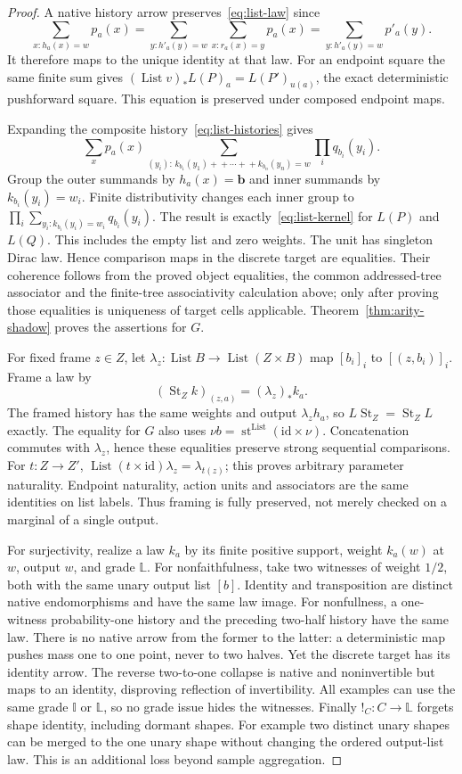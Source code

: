 \documentclass[11pt,a4paper]{article}
\theoremstyle{definition}
\newcommand{\id}{\mathrm{id}}
\newcommand{\st}{\operatorname{St}}
\newcommand{\List}{\operatorname{List}}
\begin{document}
\begin{proof}
A native history arrow preserves~\eqref{eq:list-law} since
\[
 \sum_{x:h_a(x)=w}p_a(x)
 =\sum_{y:h'_a(y)=w}\sum_{x:r_a(x)=y}p_a(x)
 =\sum_{y:h'_a(y)=w}p'_a(y).
\]
It therefore maps to the unique identity at that law. For an endpoint
square the same finite sum gives
$(\List v)_*L(P)_a=L(P')_{u(a)}$, the exact deterministic pushforward square.
This equation is preserved under composed endpoint maps.

Expanding the composite history~\eqref{eq:list-histories} gives
\[
 \sum_{x}p_a(x)
 \sum_{(y_i):\, k_{b_1}(y_1)+\!+\cdots+\!+k_{b_n}(y_n)=w}
                  \prod_iq_{b_i}(y_i).
\]
Group the outer summands by $h_a(x)=\mathbf b$ and inner summands by
$k_{b_i}(y_i)=w_i$. Finite distributivity changes each inner group to
$\prod_i\sum_{y_i:k_{b_i}(y_i)=w_i}q_{b_i}(y_i)$.
The result is exactly~\eqref{eq:list-kernel} for $L(P)$ and $L(Q)$.
This includes the empty list and zero weights. The unit has singleton
Dirac law. Hence comparison maps in the discrete target are equalities.
Their coherence follows from the proved object equalities, the common
addressed-tree associator and the finite-tree associativity calculation
above; only after proving those equalities is uniqueness of target cells
applicable. Theorem~\ref{thm:arity-shadow} proves the assertions for $G$.

For fixed frame $z\in Z$, let $\lambda_z:\List B\to\List(Z\times B)$
map $[b_i]_i$ to $[(z,b_i)]_i$. Frame a law by
\[
 (\st_Zk)_{(z,a)}=(\lambda_z)_*k_a.
\]
The framed history has the same weights and output $\lambda_zh_a$, so
$L\st_Z=\st_ZL$ exactly. The equality for $G$ also uses
$\nu b=\operatorname{st}^{\List}(\id\times\nu)$.
Concatenation commutes with $\lambda_z$, hence these equalities preserve
strong sequential comparisons. For $t:Z\to Z'$,
$\List(t\times\id)\lambda_z=\lambda_{t(z)}$; this proves arbitrary
parameter naturality. Endpoint naturality, action units and associators
are the same identities on list labels. Thus framing is fully preserved,
not merely checked on a marginal of a single output.

For surjectivity, realize a law $k_a$ by its finite positive support,
weight $k_a(w)$ at $w$, output $w$, and grade $\mathbb L$.
For nonfaithfulness, take two witnesses of weight $1/2$, both with the same
unary output list $[b]$. Identity and transposition are distinct native
endomorphisms and have the same law image. For nonfullness, a one-witness
probability-one history and the preceding two-half history have the same
law. There is no native arrow from the former to the latter: a deterministic
map pushes mass one to one point, never to two halves. Yet the discrete
target has its identity arrow. The reverse two-to-one collapse is native
and noninvertible but maps to an identity, disproving reflection of
invertibility. All examples can use the same grade $\mathbb I$ or
$\mathbb L$, so no grade issue hides the witnesses.
Finally $!_C:C\to\mathbb L$ forgets shape identity, including dormant
shapes. For example two distinct unary shapes can be merged to the one
unary shape without changing the ordered output-list law. This is an
additional loss beyond sample aggregation.
\end{proof}
\end{document}
